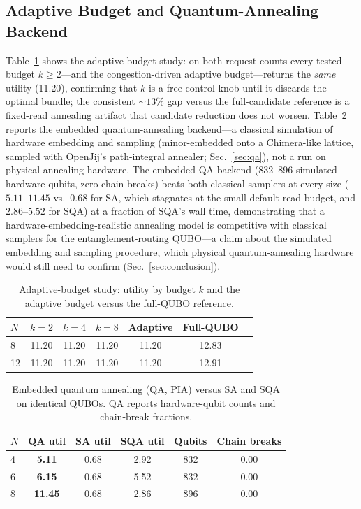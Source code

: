 \documentclass[twocolumn]{article}
\begin{document}
\subsection{Adaptive Budget and Quantum-Annealing Backend}
\label{sec:results-qa}

Table~\ref{tab:budget} shows the adaptive-budget study: on both request
counts every tested budget $k\ge2$---and the congestion-driven adaptive
budget---returns the \emph{same} utility (11.20), confirming that $k$
is a free control knob until it discards the optimal bundle; the
consistent $\sim\!13\%$ gap versus the full-candidate reference is a
fixed-read annealing artifact that candidate reduction does not
worsen.  Table~\ref{tab:qa} reports the embedded quantum-annealing
backend---a classical simulation of hardware embedding and sampling
(minor-embedded onto a Chimera-like lattice, sampled with OpenJij's
path-integral annealer; Sec.~\ref{sec:qa}), not a run on physical
annealing hardware.  The embedded QA backend (832--896 simulated
hardware qubits, zero chain breaks) beats both classical samplers at
every size ($5.11$--$11.45$ vs.\ $0.68$ for SA, which stagnates at the
small default read budget, and $2.86$--$5.52$ for SQA) at a fraction
of SQA's wall time,
demonstrating that a hardware-embedding-realistic annealing model is
competitive with classical samplers for the entanglement-routing
QUBO---a claim about the simulated embedding and sampling procedure,
which physical quantum-annealing hardware would still need to confirm
(Sec.~\ref{sec:conclusion}).

\begin{table}[tbp]
  \centering
  \caption{Adaptive-budget study: utility by budget $k$ and the
    adaptive budget versus the full-QUBO reference.}
  \label{tab:budget}
  \small\setlength{\tabcolsep}{4pt}
  \begin{tabular}{lcccccc}
    \toprule
    $N$ & $k{=}2$ & $k{=}4$ & $k{=}8$ & Adaptive & Full-QUBO \\
    \midrule
    8  & 11.20 & 11.20 & 11.20 & 11.20 & 12.83 \\
    12 & 11.20 & 11.20 & 11.20 & 11.20 & 12.91 \\
    \bottomrule
  \end{tabular}
\end{table}

\begin{table}[tbp]
  \centering
  \caption{Embedded quantum annealing (QA, PIA) versus SA and SQA on
    identical QUBOs.  QA reports hardware-qubit counts and chain-break
    fractions.}
  \label{tab:qa}
  \small\setlength{\tabcolsep}{4pt}
  \begin{tabular}{lccccc}
    \toprule
    $N$ & QA util & SA util & SQA util & Qubits & Chain breaks \\
    \midrule
    4 & \textbf{5.11} & 0.68 & 2.92 & 832 & 0.00 \\
    6 & \textbf{6.15} & 0.68 & 5.52 & 832 & 0.00 \\
    8 & \textbf{11.45} & 0.68 & 2.86 & 896 & 0.00 \\
    \bottomrule
  \end{tabular}
\end{table}
\end{document}
